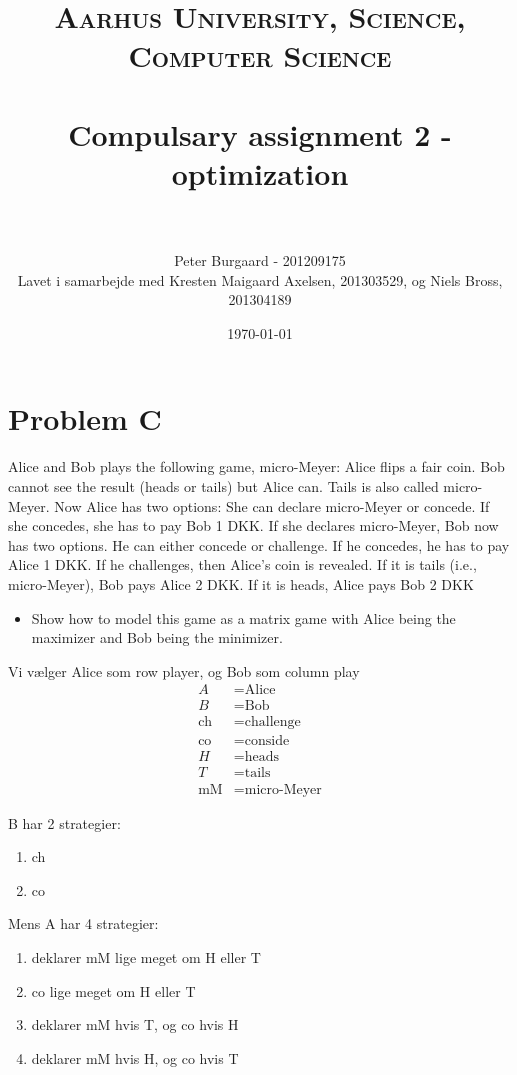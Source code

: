 \documentclass[paper=a4, fontsize=11pt]{scrartcl} %
\title{	
	\normalfont \normalsize 
	\textsc{Aarhus University, Science, Computer Science} \\ [25pt] %
	\horrule{0.5pt} \\[0.4cm] %
	\huge Compulsary assignment 2 - optimization \\ %
	\horrule{2pt} \\[0.5cm] %
}
\author{Peter Burgaard - 201209175 \\ 
	\large Lavet i samarbejde med Kresten Maigaard Axelsen, 201303529, og Niels Bross, 201304189} %
\date{\normalsize\today} %
\numberwithin{equation}{section} %
\numberwithin{figure}{section} %
\numberwithin{table}{section} %
\begin{document}
	
	\maketitle %
	
	\section{Problem C}
	Alice and Bob plays the following game, micro-Meyer:  Alice flips a fair coin.  Bob cannot see the result (heads or tails) but Alice can.  Tails is also called micro-Meyer.  Now Alice has two options:  She can declare micro-Meyer or concede.  If she concedes, she has to pay Bob 1 DKK. If she declares micro-Meyer,  Bob now has two options.  He can either concede or challenge.  If he concedes, he has to pay Alice 1 DKK. If he challenges, then Alice's coin is revealed.  If it is tails (i.e., micro-Meyer), Bob pays Alice 2 DKK. If it is heads, Alice pays Bob 2 DKK
	
	\begin{itemize}
		\item Show how to model this game as a matrix game with Alice being the maximizer and Bob being the minimizer.
	\end{itemize}
	
	Vi vælger Alice som row player, og Bob som column play
	\begin{align*}
	A &= \text{Alice} \\
	B &= \text{Bob} \\
	\text{ch} &= \text{challenge} \\
	\text{co} &= \text{conside} \\
	H &= \text{heads} \\
	T &=\text{tails} \\
	\text{mM} &=\text{micro-Meyer}
	\end{align*}
	
	B har 2 strategier: 
	\begin{enumerate}
		\item ch
		\item co 
	\end{enumerate}
	
	Mens A har 4 strategier: 
	\begin{enumerate}
		\item deklarer mM lige meget om H eller T 
		\item co lige meget om H eller T
		\item deklarer mM hvis T, og co hvis H 
		\item deklarer mM hvis H, og co hvis T
	\end{enumerate}  
	
\end{document}
